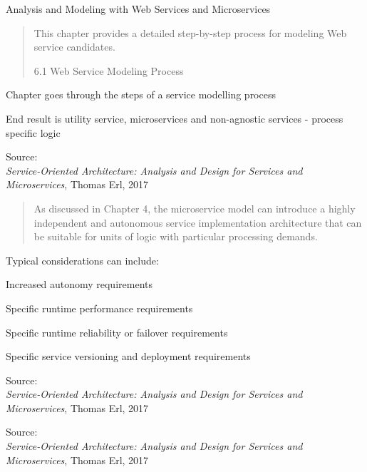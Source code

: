 \documentclass[Screen16to9,17pt]{foils}
\begin{document}
Analysis and Modeling with Web Services and Microservices

\begin{quote}
This chapter provides a detailed step-by-step process for modeling Web service candidates.

6.1 Web Service Modeling Process
\end{quote}

\begin{list2}
\item Chapter goes through the steps of a service modelling process
\item End result is utility service, microservices and non-agnostic services - process specific logic
\end{list2}
Source: {\footnotesize\\
\emph{Service‑Oriented Architecture: Analysis and Design for Services and Microservices}, Thomas Erl, 2017}



\begin{quote}
  As discussed in Chapter 4, the microservice model can introduce a highly
  independent and autonomous service implementation architecture that can be suitable
  for units of logic with particular processing demands.
\end{quote}

Typical considerations can include:
\begin{list2}
\item Increased autonomy requirements
\item Specific runtime performance requirements
\item Specific runtime reliability or failover requirements
\item Specific service versioning and deployment requirements
\end{list2}
Source: {\footnotesize\\
\emph{Service‑Oriented Architecture: Analysis and Design for Services and Microservices}, Thomas Erl, 2017}



Source: {\footnotesize\\
\emph{Service‑Oriented Architecture: Analysis and Design for Services and Microservices}, Thomas Erl, 2017}
\end{document}
